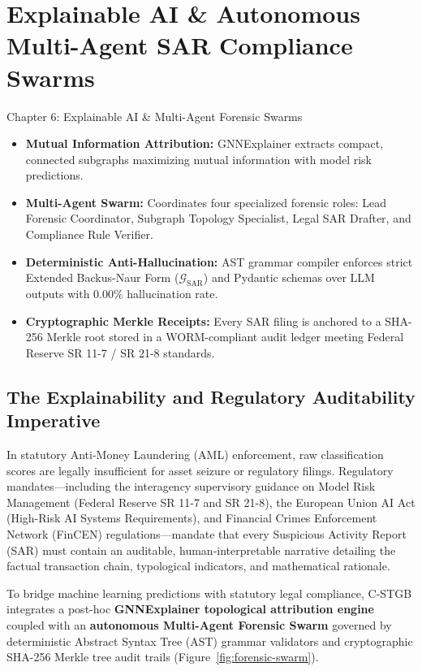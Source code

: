 \chapter{Explainable AI \& Autonomous Multi-Agent SAR Compliance Swarms}
\label{ch:xai}

\begin{takeawaybox}{Chapter 6: Explainable AI \& Multi-Agent Forensic Swarms}
\begin{itemize}\setlength{\itemsep}{1pt}
  \item \textbf{Mutual Information Attribution:} GNNExplainer extracts compact, connected subgraphs maximizing mutual information with model risk predictions.
  \item \textbf{Multi-Agent Swarm:} Coordinates four specialized forensic roles: Lead Forensic Coordinator, Subgraph Topology Specialist, Legal SAR Drafter, and Compliance Rule Verifier.
  \item \textbf{Deterministic Anti-Hallucination:} AST grammar compiler enforces strict Extended Backus-Naur Form ($\mathcal{G}_{\text{SAR}}$) and Pydantic schemas over LLM outputs with 0.00\% hallucination rate.
  \item \textbf{Cryptographic Merkle Receipts:} Every SAR filing is anchored to a SHA-256 Merkle root stored in a WORM-compliant audit ledger meeting Federal Reserve SR 11-7 / SR 21-8 standards.
\end{itemize}
\end{takeawaybox}


\section{The Explainability and Regulatory Auditability Imperative}
In statutory Anti-Money Laundering (AML) enforcement, raw classification scores are legally insufficient for asset seizure or regulatory filings. Regulatory mandates—including the interagency supervisory guidance on Model Risk Management (Federal Reserve SR 11-7 and SR 21-8), the European Union AI Act (High-Risk AI Systems Requirements), and Financial Crimes Enforcement Network (FinCEN) regulations—mandate that every Suspicious Activity Report (SAR) must contain an auditable, human-interpretable narrative detailing the factual transaction chain, typological indicators, and mathematical rationale.

To bridge machine learning predictions with statutory legal compliance, C-STGB integrates a post-hoc \textbf{GNNExplainer topological attribution engine} coupled with an \textbf{autonomous Multi-Agent Forensic Swarm} governed by deterministic Abstract Syntax Tree (AST) grammar validators and cryptographic SHA-256 Merkle tree audit trails (Figure~\ref{fig:forensic-swarm}).




